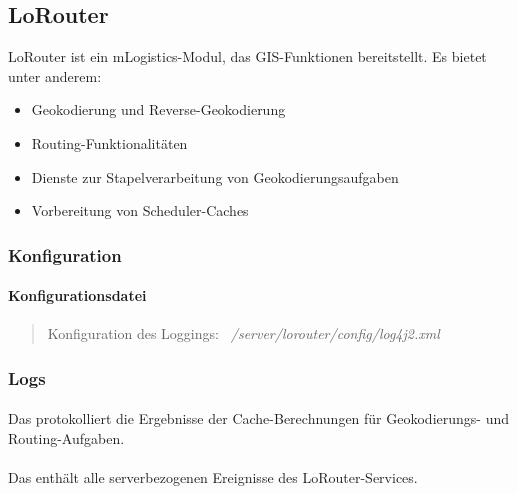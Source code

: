 \subsection{LoRouter}

LoRouter ist ein mLogistics-Modul, das GIS-Funktionen bereitstellt.  
Es bietet unter anderem:

\begin{itemize}
    \item Geokodierung und Reverse-Geokodierung
    \item Routing-Funktionalitäten
    \item Dienste zur Stapelverarbeitung von Geokodierungsaufgaben
    \item Vorbereitung von Scheduler-Caches
\end{itemize}

\subsubsection{Konfiguration}

\paragraph{Konfigurationsdatei}
\vspace{0.5em}
\begin{quote}
Konfiguration des Loggings: \textit{~/server/lorouter/config/log4j2.xml}
\end{quote}

\subsubsection{Logs}

\paragraph{\lorouterCacheExecutionResultLog}
Das \texttt{\lorouterCacheExecutionResultLog} protokolliert die Ergebnisse der Cache-Berechnungen für Geokodierungs- und Routing-Aufgaben.

\paragraph{\lorouterServerLog}
Das \texttt{\lorouterServerLog} enthält alle serverbezogenen Ereignisse des LoRouter-Services.
